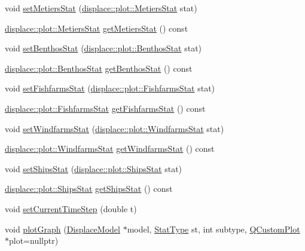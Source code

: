 \begin{DoxyCompactItemize}
\item 
void \mbox{\hyperlink{class_stats_controller_aa06565bb5265103ee57c521353645c8c}{set\+Metiers\+Stat}} (\mbox{\hyperlink{namespacedisplace_1_1plot_a673bbc813b7f03be3dc76ae7fd087516}{displace\+::plot\+::\+Metiers\+Stat}} stat)
\item 
\mbox{\hyperlink{namespacedisplace_1_1plot_a673bbc813b7f03be3dc76ae7fd087516}{displace\+::plot\+::\+Metiers\+Stat}} \mbox{\hyperlink{class_stats_controller_a024d7d5105fd24b93f3922b1dc51b931}{get\+Metiers\+Stat}} () const
\item 
void \mbox{\hyperlink{class_stats_controller_ac79198bc4650c721091f9a031612e906}{set\+Benthos\+Stat}} (\mbox{\hyperlink{namespacedisplace_1_1plot_a3a91ceda6f3e5855d0e7cf97e8dea045}{displace\+::plot\+::\+Benthos\+Stat}} stat)
\item 
\mbox{\hyperlink{namespacedisplace_1_1plot_a3a91ceda6f3e5855d0e7cf97e8dea045}{displace\+::plot\+::\+Benthos\+Stat}} \mbox{\hyperlink{class_stats_controller_a348979bb030615dc741f71b0fad745a9}{get\+Benthos\+Stat}} () const
\item 
void \mbox{\hyperlink{class_stats_controller_abc5a66c3e54b9f41b18384d16240bd88}{set\+Fishfarms\+Stat}} (\mbox{\hyperlink{namespacedisplace_1_1plot_a4746af73ffe0625cf87b8fb07fd5bfa4}{displace\+::plot\+::\+Fishfarms\+Stat}} stat)
\item 
\mbox{\hyperlink{namespacedisplace_1_1plot_a4746af73ffe0625cf87b8fb07fd5bfa4}{displace\+::plot\+::\+Fishfarms\+Stat}} \mbox{\hyperlink{class_stats_controller_a3a28bd0a3145058285384cc3e2de6d11}{get\+Fishfarms\+Stat}} () const
\item 
void \mbox{\hyperlink{class_stats_controller_a738e8fc35e5e9783406d4d02f3b39fc7}{set\+Windfarms\+Stat}} (\mbox{\hyperlink{namespacedisplace_1_1plot_a8b9bfd155809bb203b09c572304a62c3}{displace\+::plot\+::\+Windfarms\+Stat}} stat)
\item 
\mbox{\hyperlink{namespacedisplace_1_1plot_a8b9bfd155809bb203b09c572304a62c3}{displace\+::plot\+::\+Windfarms\+Stat}} \mbox{\hyperlink{class_stats_controller_a11d392bda81a610e515797ee49e9d94d}{get\+Windfarms\+Stat}} () const
\item 
void \mbox{\hyperlink{class_stats_controller_a477bc8d01f5be49dfea6da50ecc084bb}{set\+Ships\+Stat}} (\mbox{\hyperlink{namespacedisplace_1_1plot_a8c50b4d54cafba744b1b5b51b53407e0}{displace\+::plot\+::\+Ships\+Stat}} stat)
\item 
\mbox{\hyperlink{namespacedisplace_1_1plot_a8c50b4d54cafba744b1b5b51b53407e0}{displace\+::plot\+::\+Ships\+Stat}} \mbox{\hyperlink{class_stats_controller_a6ea8bb040cd7f68f76b028827afddbed}{get\+Ships\+Stat}} () const
\item 
void \mbox{\hyperlink{class_stats_controller_acaa2a1d91de9a73a7c854fe520f0b902}{set\+Current\+Time\+Step}} (double t)
\item 
void \mbox{\hyperlink{class_stats_controller_a41acab0d55b925b49ce267ba4e98438e}{plot\+Graph}} (\mbox{\hyperlink{class_displace_model}{Displace\+Model}} $\ast$model, \mbox{\hyperlink{class_stats_controller_a57467d760850639d3b0c55277b7e7ee9}{Stat\+Type}} st, int subtype, \mbox{\hyperlink{class_q_custom_plot}{Q\+Custom\+Plot}} $\ast$plot=nullptr)
\end{DoxyCompactItemize}
